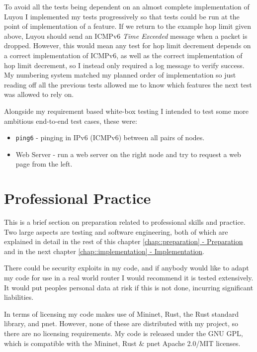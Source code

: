 \documentclass[12pt,a4paper,twoside,openany]{report}
\begin{document}
\bigskip

To avoid all the tests being dependent on an almost complete implementation of Luyou I implemented my tests progressively so that tests could be run at the point of implementation of a feature. If we return to the example hop limit given above, Luyou should send an ICMPv6 \textit{Time Exceeded} message when a packet is dropped.  However, this would mean any test for hop limit decrement depends on a correct implementation of ICMPv6, as well as the correct implementation of hop limit decrement, so I instead only required a log message to verify success.  My numbering system matched my planned order of implementation so just reading off all the previous tests allowed me to know which features the next test was allowed to rely on.  

\bigskip

Alongside my requirement based white-box testing I intended to test some more ambitious end-to-end test cases, these were:
\begin{itemize}
\item \verb!ping6! - pinging in IPv6 (ICMPv6) between all pairs of nodes.
\item Web Server - run a web server on the right node and try to request a web page from the left.
\end{itemize}

\section{Professional Practice}
This is a brief section on preparation related to professional skills and practice.  Two large aspects are testing and software engineering, both of which are explained in detail in the rest of this chapter \ref{chap::preparation}\hyperref[chap::preparation]{ - Preparation} and in the next chapter \ref{chap::implementation}\hyperref[chap::implementation]{ - Implementation}.  

\bigskip

There could be security exploits in my code, and if anybody would like to adapt my code for use in a real world router I would recommend it is tested extensively.  It would put peoples personal data at risk if this is not done, incurring significant liabilities.

\bigskip

In terms of licensing my code makes use of Mininet, Rust, the Rust standard library, and pnet.  However, none of these are distributed with my project, so there are no licensing requirements. My code is released under the GNU GPL\cite{gpl}, which is compatible with the Mininet, Rust \& pnet Apache 2.0/MIT licenses.
\end{document}
